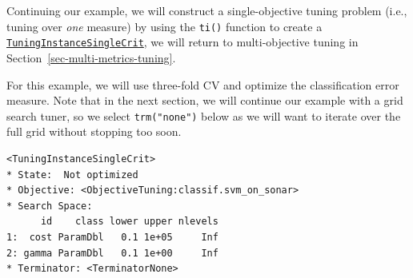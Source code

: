Continuing our example, we will construct a
single-objective tuning problem (i.e., tuning
over \emph{one} measure) by using the \texttt{ti()} function to create a
\href{https://mlr3tuning.mlr-org.com/reference/TuningInstanceSingleCrit.html}{\texttt{TuningInstanceSingleCrit}},
we will return to multi-objective tuning
in Section~\ref{sec-multi-metrics-tuning}.

For this example, we will use three-fold CV and optimize the
classification error measure. Note that in the next section, we will
continue our example with a grid search tuner, so we select
\texttt{trm("none")} below as we will want to iterate over the full grid
without stopping too soon.

\begin{Shaded}
\begin{Highlighting}[]
\OtherTok{=} \NormalTok{(}\NormalTok{)}

\OtherTok{=} \NormalTok{(}\NormalTok{,}
   \NormalTok{(}\NormalTok{, }\NormalTok{),}
   \NormalTok{(}\NormalTok{, }\NormalTok{),}
   \NormalTok{,}
   
\NormalTok{)}

\OtherTok{=} \NormalTok{(}
   \NormalTok{(}\NormalTok{, } \NormalTok{),}
   \NormalTok{(}\NormalTok{),}
   \NormalTok{(}\NormalTok{)}
\NormalTok{)}

\end{Highlighting}
\end{Shaded}

\begin{verbatim}
<TuningInstanceSingleCrit>
* State:  Not optimized
* Objective: <ObjectiveTuning:classif.svm_on_sonar>
* Search Space:
      id    class lower upper nlevels
1:  cost ParamDbl   0.1 1e+05     Inf
2: gamma ParamDbl   0.1 1e+00     Inf
* Terminator: <TerminatorNone>
\end{verbatim}

